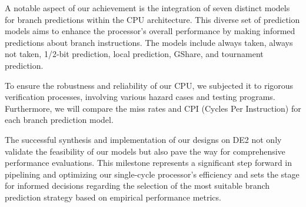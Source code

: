 \documentclass[12pt,a4paper,oneside]{book} %
\begin{document}
A notable aspect of our achievement is the integration of seven distinct models for branch predictions within the CPU architecture. This diverse set of prediction models aims to enhance the processor's overall performance by making informed predictions about branch instructions. The models include always taken, always not taken, 1/2-bit prediction, local prediction, GShare, and tournament prediction.

To ensure the robustness and reliability of our CPU, we subjected it to rigorous verification processes, involving various hazard cases and testing programs. Furthermore, we will compare the miss rates and CPI (Cycles Per Instruction) for each branch prediction model.

The successful synthesis and implementation of our designs on DE2 not only validate the feasibility of our models but also pave the way for comprehensive performance evaluations. This milestone represents a significant step forward in pipelining and optimizing our single-cycle processor's efficiency and sets the stage for informed decisions regarding the selection of the most suitable branch prediction strategy based on empirical performance metrics.
\end{document}
